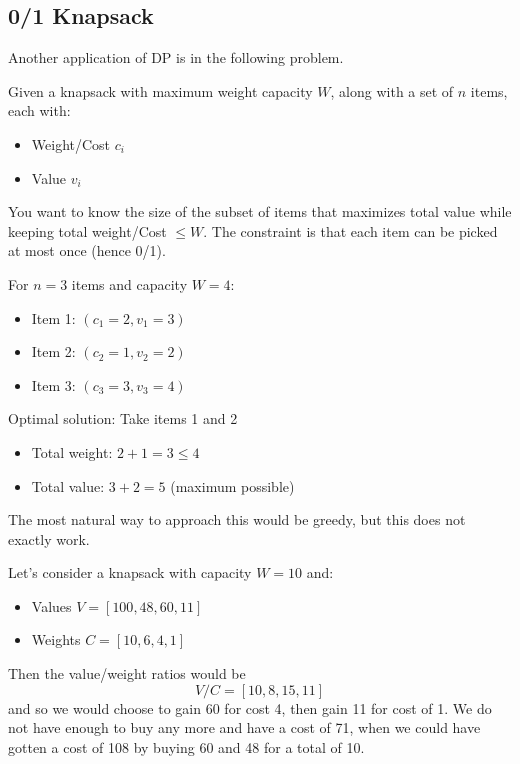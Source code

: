 \subsection{0/1 Knapsack} 

  Another application of DP is in the following problem. 

  \begin{definition}[0/1 Knapsack]
    Given a knapsack with maximum weight capacity $W$, along with a set of $n$ items, each with:
    \begin{itemize}
      \item Weight/Cost $c_i$
      \item Value $v_i$
    \end{itemize}
    You want to know the size of the subset of items that maximizes total value while keeping total weight/Cost $\leq W$. The constraint is that each item can be picked at most once (hence 0/1). 
  \end{definition}

  \begin{example}
    For $n = 3$ items and capacity $W = 4$:
    \begin{itemize}
      \item Item 1: $(c_1 = 2, v_1 = 3)$
      \item Item 2: $(c_2 = 1, v_2 = 2)$
      \item Item 3: $(c_3 = 3, v_3 = 4)$
    \end{itemize}
    Optimal solution: Take items 1 and 2
    \begin{itemize}
      \item Total weight: $2 + 1 = 3 \leq 4$
      \item Total value: $3 + 2 = 5$ (maximum possible)
    \end{itemize}
  \end{example}

  The most natural way to approach this would be greedy, but this does not exactly work. 

  \begin{example}
    Let's consider a knapsack with capacity $W = 10$ and:
    \begin{itemize}
      \item Values $V = [100, 48, 60, 11]$
      \item Weights $C = [10, 6, 4, 1]$
    \end{itemize}
    Then the value/weight ratios would be 
    \begin{equation}
      V/C = [10, 8, 15, 11]
    \end{equation}
    and so we would choose to gain 60 for cost 4, then gain 11 for cost of 1. We do not have enough to buy any more and have a cost of 71, when we could have gotten a cost of 108 by buying 60 and 48 for a total of 10. 
  \end{example}

